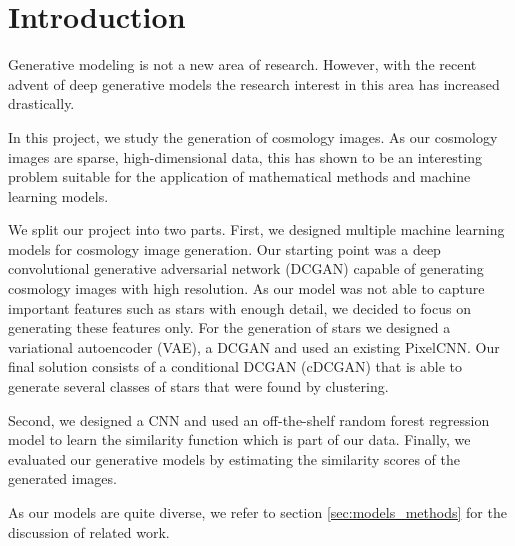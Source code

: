 \documentclass[10pt,conference,compsocconf]{IEEEtran}
\newcommand\TODO[1]{\textcolor{red}{#1}} %
\begin{document}
\section{Introduction}
\label{sec:introduction}
Generative modeling is not a new area of research. However, with the recent advent of deep generative models the research interest in this area has increased drastically. 

In this project, we study the generation of cosmology images. As our cosmology images are sparse, high-dimensional data, this has shown to be an interesting problem suitable for the application of mathematical methods and machine learning models.

We split our project into two parts. First, we designed multiple machine learning models for cosmology image generation. Our starting point was a deep convolutional generative adversarial network (DCGAN) capable of generating cosmology images with high resolution. As our model was not able to capture important features such as stars with enough detail, we decided to focus on generating these features only. For the generation of stars we designed a variational autoencoder (VAE), a DCGAN and used an existing PixelCNN. Our final solution consists of a conditional DCGAN (cDCGAN) that is able to generate several classes of stars that were found by clustering.

Second, we designed a CNN and used an off-the-shelf random forest regression model to learn the similarity function which is part of our data. Finally, we evaluated our generative models by estimating the similarity scores of the generated images. 


As our models are quite diverse, we refer to section \ref{sec:models_methods} for the discussion of related work.


\end{document}
